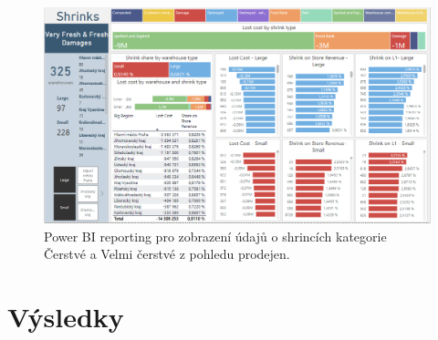 \begin{figure}[hbtp!]
    \centering
    \captionsetup{justification=centering}
    \includegraphics[width=\textwidth]{obrazky/PBI/storesSFF.png}
    \caption{Power BI reporting pro zobrazení údajů o shrincích kategorie Čerstvé a Velmi čerstvé z pohledu prodejen.}
    \label{obr:PBI:storesSFF}
\end{figure}

\section{Výsledky}
\label{sec:vizualizace:vysl}
